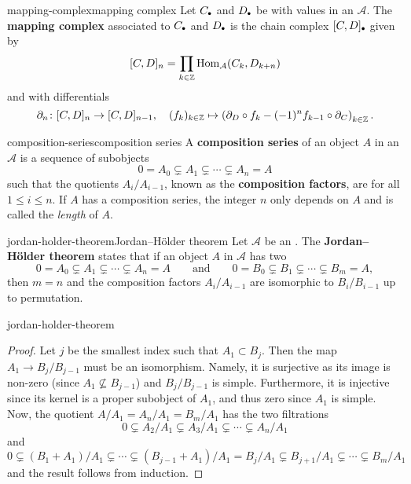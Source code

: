 \begin{topic}{mapping-complex}{mapping complex}
    Let $C_\bdot$ and $D_\bdot$ be  with values in an  $\mathcal{A}$. The \textbf{mapping complex} associated to $C_\bdot$ and $D_\bdot$ is the chain complex $[C, D] _\bdot$ given by
    \[ [C, D]_n = \prod_{k \in \mathbb{Z}} \operatorname{Hom}_\mathcal{A}(C_k, D_{k + n}) \]
    and with differentials
    \[ \partial_n \colon [C, D]_n \to [C, D]_{n - 1}, \quad (f_k)_{k \in \mathbb{Z}} \mapsto \left(\partial_D \circ f_k - (-1)^n f_{k - 1} \circ \partial_C \right)_{k \in \mathbb{Z}} . \]
\end{topic}

\begin{topic}{composition-series}{composition series}
    A \textbf{composition series} of an object $A$ in an  $\mathcal{A}$ is a sequence of subobjects
    \[ 0 = A_0 \subsetneq A_1 \subsetneq \cdots \subsetneq A_n = A \]
    such that the quotients $A_i/A_{i - 1}$, known as the \textbf{composition factors}, are  for all $1 \le i \le n$. If $A$ has a composition series, the integer $n$ only depends on $A$ and is called the \textit{length} of $A$.
\end{topic}

\begin{topic}{jordan-holder-theorem}{Jordan--Hölder theorem}
    Let $\mathcal{A}$ be an . The \textbf{Jordan--Hölder theorem} states that if an object $A$ in $\mathcal{A}$ has two 
    \[ 0 = A_0 \subsetneq A_1 \subsetneq \cdots \subsetneq A_n = A \qquad \text{and} \qquad 0 = B_0 \subsetneq B_1 \subsetneq \cdots \subsetneq B_m = A , \]
    then $m = n$ and the composition factors $A_i/A_{i - 1}$ are isomorphic to $B_i/B_{i - 1}$ up to permutation.
\end{topic}

\begin{example}{jordan-holder-theorem}
    \begin{proof}
        Let $j$ be the smallest index such that $A_1 \subset B_j$. Then the map $A_1 \to B_j/B_{j - 1}$ must be an isomorphism. Namely, it is surjective as its image is non-zero (since $A_1 \nsubseteq B_{j - 1}$) and $B_j/B_{j - 1}$ is simple. Furthermore, it is injective since its kernel is a proper subobject of $A_1$, and thus zero since $A_1$ is simple. Now, the quotient $A/A_1 = A_n/A_1 = B_m/A_1$ has the two filtrations
        \[ 0 \subsetneq A_2/A_1 \subsetneq A_3/A_1 \subsetneq \cdots \subsetneq A_n/A_1 \]
        and
        \[ 0 \subsetneq (B_1 + A_1)/A_1 \subsetneq \cdots \subsetneq (B_{j - 1} + A_1)/A_1 = B_j/A_1 \subsetneq B_{j + 1}/A_1 \subsetneq \cdots \subsetneq B_m/A_1 \]
        and the result follows from induction.    
    \end{proof}
\end{example}

